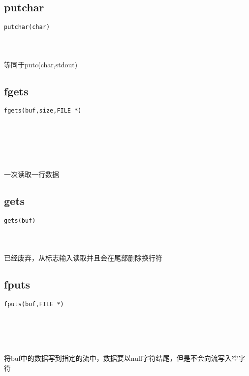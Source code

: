 \documentclass[10pt,a4paper]{article}
\begin{document}
\subsection{putchar}
\begin{spacing}{2.0}
\lstset{language=C,numbers=none}
\begin{lstlisting}
putchar(char)
\end{lstlisting}
{\large\color[rgb]{0.2,0.4,0.6}{char:}}
\paragraph{ \ \ }等同于putc(char,stdout)
\end{spacing}

\subsection{fgets}
\begin{spacing}{2.0}
\lstset{language=C,numbers=none}
\begin{lstlisting}
fgets(buf,size,FILE *)
\end{lstlisting}
{\large\color[rgb]{0.2,0.4,0.6}{buf:}} \\
{\large\color[rgb]{0.2,0.4,0.6}{size:}} \\
{\large\color[rgb]{0.2,0.4,0.6}{*:}}
\paragraph{ \ \ }一次读取一行数据
\end{spacing}

\subsection{gets}
\begin{spacing}{2.0}
\lstset{language=C,numbers=none}
\begin{lstlisting}
gets(buf)
\end{lstlisting}
{\large\color[rgb]{0.2,0.4,0.6}{buf:}}
\paragraph{ \ \ }已经废弃，从标志输入读取并且会在尾部删除换行符
\end{spacing}

\subsection{fputs}
\begin{spacing}{2.0}
\lstset{language=C,numbers=none}
\begin{lstlisting}
fputs(buf,FILE *)
\end{lstlisting}
{\large\color[rgb]{0.2,0.4,0.6}{buf:}} \\
{\large\color[rgb]{0.2,0.4,0.6}{*:}}
\paragraph{ \ \ }将buf中的数据写到指定的流中，数据要以null字符结尾，但是不会向流写入空字符
\end{spacing}
\end{document}
